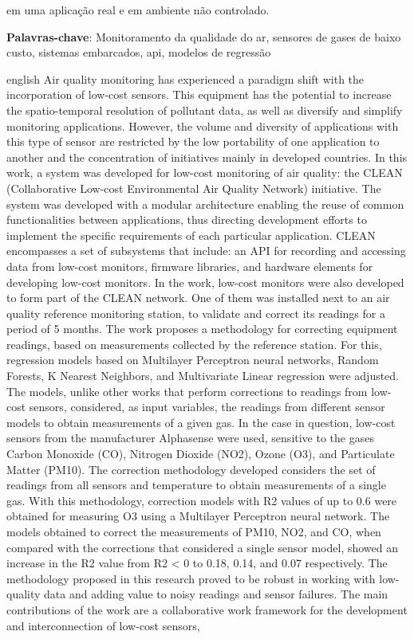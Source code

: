 \begin{resumo}
em uma aplicação real e em ambiente não controlado.
	
	\textbf{Palavras-chave}: Monitoramento da qualidade do ar, sensores de gases de baixo custo, sistemas embarcados, \acrshort{api}, modelos de regressão
\end{resumo}

\begin{resumo}[Abstract]
	\SingleSpacing
	\begin{otherlanguage*}{english}
		Air quality monitoring has experienced a paradigm shift with the incorporation of low-cost sensors. This equipment has the potential to increase the spatio-temporal resolution of pollutant data, as well as diversify and simplify monitoring applications. However, the volume and diversity of applications with this type of sensor are restricted by the low portability of one application to another and the concentration of initiatives mainly in developed countries. In this work, a system was developed for low-cost monitoring of air quality: the CLEAN (Collaborative Low-cost Environmental Air Quality Network) initiative. The system was developed with a modular architecture enabling the reuse of common functionalities between applications, thus directing development efforts to implement the specific requirements of each particular application. CLEAN encompasses a set of subsystems that include: an API for recording and accessing data from low-cost monitors, firmware libraries, and hardware elements for developing low-cost monitors. In the work, low-cost monitors were also developed to form part of the CLEAN network. One of them was installed next to an air quality reference monitoring station, to validate and correct its readings for a period of 5 months. The work proposes a methodology for correcting equipment readings, based on measurements collected by the reference station. For this, regression models based on Multilayer Perceptron neural networks, Random Forests, K Nearest Neighbors, and Multivariate Linear regression were adjusted. The models, unlike other works that perform corrections to readings from low-cost sensors, considered, as input variables, the readings from different sensor models to obtain measurements of a given gas. In the case in question, low-cost sensors from the manufacturer Alphasense were used, sensitive to the gases Carbon Monoxide (CO), Nitrogen Dioxide (NO2), Ozone (O3), and Particulate Matter (PM10). The correction methodology developed considers the set of readings from all sensors and temperature to obtain measurements of a single gas. With this methodology, correction models with R2 values of up to 0.6 were obtained for measuring O3 using a Multilayer Perceptron neural network. The models obtained to correct the measurements of PM10, NO2, and CO, when compared with the corrections that considered a single sensor model, showed an increase in the R2 value from R2 < 0 to 0.18, 0.14, and 0.07 respectively. The methodology proposed in this research proved to be robust in working with low-quality data and adding value to noisy readings and sensor failures. The main contributions of the work are a collaborative work framework for the development and interconnection of low-cost sensors, 
\end{otherlanguage*}
\end{resumo}
